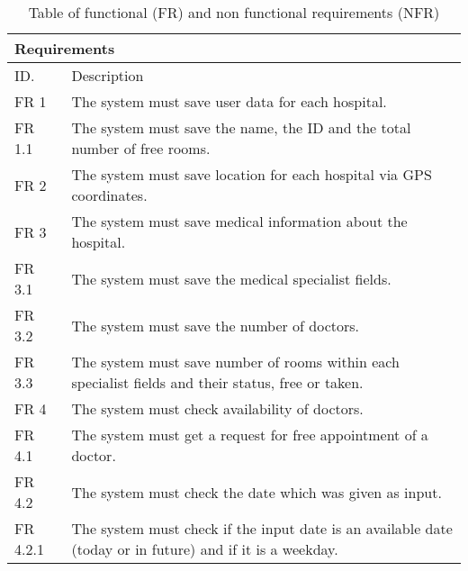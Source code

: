 \begin{table}
\centering
\caption{Table of functional (FR) and non functional requirements (NFR)}
\label{tab_refs}
\setlength{\extrarowheight}{0pt}
\addtolength{\extrarowheight}{\aboverulesep}
\addtolength{\extrarowheight}{\belowrulesep}
\setlength{\aboverulesep}{0pt}
\setlength{\belowrulesep}{0pt}
\begin{tabular}{|l|l|} 
\toprule
\multicolumn{2}{|l|}{{\cellcolor[rgb]{0.753,0.753,0.753}}Requirements}                                                                                                                        \\ 
\hline
ID.                                       & Description                                                                         \\ 
\hline
\hline
\rowcolor[rgb]{0.894,0.894,0.894} 
FR 1  & The system must save user data for each hospital.                                      
\\ 
\hline
FR 1.1 & The system must save the name, the ID and the total number of free rooms.                         
\\ 
\hline
\rowcolor[rgb]{0.894,0.894,0.894} 
FR 2  & The system must save location for each hospital via GPS coordinates.               
\\ 
\hline
FR 3  & The system must save medical information about the hospital.                       
\\ 
\hline
\rowcolor[rgb]{0.894,0.894,0.894} 
FR 3.1 & The system must save the medical specialist fields.                              
\\ 
\hline
FR 3.2  & The system must save the number of doctors.                                        
\\ 
\hline
\rowcolor[rgb]{0.894,0.894,0.894} 
FR 3.3   & The system must save number of rooms within each specialist fields and their status, free or taken.         
\\ 
\hline
FR 4 & The system must check availability of doctors.                                                                
\\ 
\hline
\rowcolor[rgb]{0.894,0.894,0.894} 
FR 4.1  & The system must get a request for free appointment of a doctor.                    
\\ 
\hline
FR 4.2  & The system must check the date which was given as input.                           
\\ 
\hline
\rowcolor[rgb]{0.894,0.894,0.894} 
FR 4.2.1 & The system must check if the input date is an available date (today or in future) and if it is a weekday.    

\end{tabular}
\end{table}
